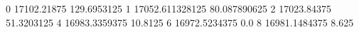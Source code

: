 0 17102.21875 129.6953125
1 17052.611328125 80.087890625
2 17023.84375 51.3203125
4 16983.3359375 10.8125
6 16972.5234375 0.0
8 16981.1484375 8.625
